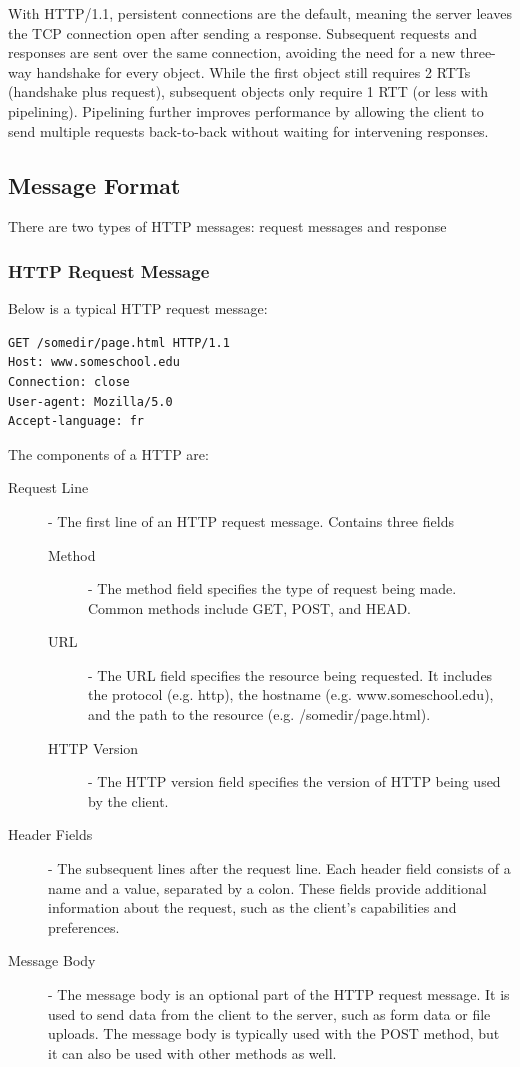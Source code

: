 \documentclass[12pt letter]{report}
\begin{document}
With HTTP/1.1, persistent connections are the default, meaning the
server leaves the TCP connection open after sending a response.
Subsequent requests and responses are sent over the same connection,
avoiding the need for a new three-way handshake for every object.
While the first object still requires 2 RTTs (handshake plus
request), subsequent objects only require 1 RTT (or less with
pipelining). Pipelining further improves performance by allowing the
client to send multiple requests back-to-back without waiting for
intervening responses.

\subsection{Message Format}

There are two types of HTTP messages: request messages and response

\subsubsection{HTTP Request Message}

Below is a typical HTTP request message:
\begin{verbatim}
GET /somedir/page.html HTTP/1.1
Host: www.someschool.edu
Connection: close
User-agent: Mozilla/5.0
Accept-language: fr
\end{verbatim}

The components of a HTTP are:
\begin{description}
  \item[Request Line]  - The first line of an HTTP request message.
    Contains three fields
    \begin{description}
      \item[Method]  - The method field specifies the type of request
        being made. Common
        methods include GET, POST, and HEAD.
      \item[URL] - The URL field specifies the resource being
        requested. It includes the
        protocol (e.g. http), the hostname (e.g. www.someschool.edu),
        and the path
        to the resource (e.g. /somedir/page.html).
      \item[HTTP Version] - The HTTP version field specifies the
        version of HTTP being
        used by the client.
    \end{description}
  \item[Header Fields] - The subsequent lines after the request line.
    Each header field consists of a name and a value, separated by a
    colon. These fields provide additional information about the
    request, such as the client's capabilities and preferences.
  \item[Message Body] - The message body is an optional part of the HTTP
    request message. It is used to send data from the client to the
    server, such as form data or file uploads. The message body is
    typically used with the POST method, but it can also be used with
    other methods as well.
\end{description}
\end{document}
